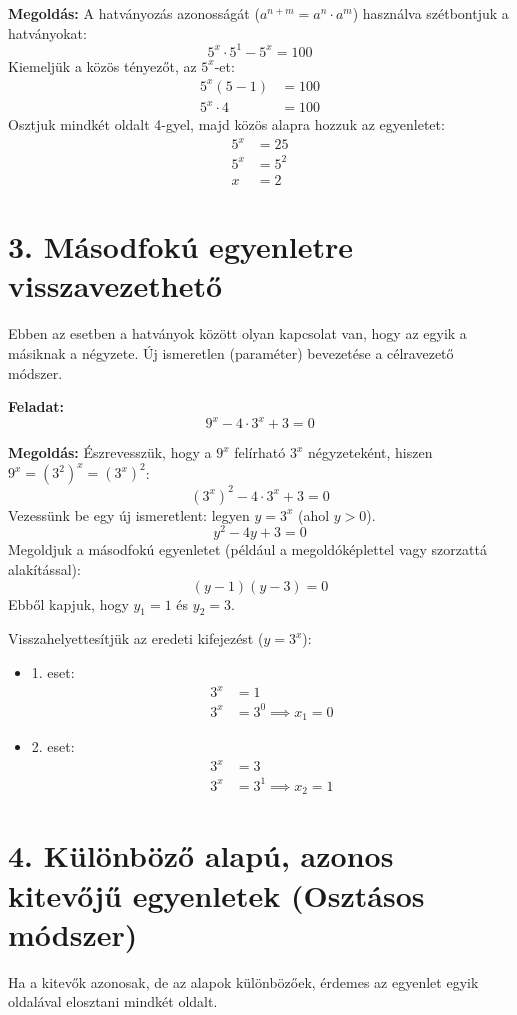 \documentclass[11pt, a4paper]{article}
\begin{document}
\textbf{Megoldás:}
A hatványozás azonosságát ($a^{n+m} = a^n \cdot a^m$) használva szétbontjuk a hatványokat:
\[ 5^x \cdot 5^1 - 5^x = 100 \]
Kiemeljük a közös tényezőt, az $5^x$-et:
\begin{align*}
5^x(5 - 1) &= 100 \\
5^x \cdot 4 &= 100
\end{align*}
Osztjuk mindkét oldalt 4-gyel, majd közös alapra hozzuk az egyenletet:
\begin{align*}
5^x &= 25 \\
5^x &= 5^2 \\
x &= 2
\end{align*}


\section*{3. Másodfokú egyenletre visszavezethető}
Ebben az esetben a hatványok között olyan kapcsolat van, hogy az egyik a másiknak a négyzete. Új ismeretlen (paraméter) bevezetése a célravezető módszer.

\textbf{Feladat:}
\[ 9^x - 4 \cdot 3^x + 3 = 0 \]

\textbf{Megoldás:}
Észrevesszük, hogy a $9^x$ felírható $3^x$ négyzeteként, hiszen $9^x = (3^2)^x = (3^x)^2$:
\[ (3^x)^2 - 4 \cdot 3^x + 3 = 0 \]
Vezessünk be egy új ismeretlent: legyen $y = 3^x$ (ahol $y > 0$).
\[ y^2 - 4y + 3 = 0 \]
Megoldjuk a másodfokú egyenletet (például a megoldóképlettel vagy szorzattá alakítással):
\[ (y - 1)(y - 3) = 0 \]
Ebből kapjuk, hogy $y_1 = 1$ és $y_2 = 3$.

Visszahelyettesítjük az eredeti kifejezést ($y = 3^x$):
\begin{itemize}
    \item 1. eset:
    \begin{align*}
    3^x &= 1 \\
    3^x &= 3^0 \implies x_1 = 0
    \end{align*}
    \item 2. eset:
    \begin{align*}
    3^x &= 3 \\
    3^x &= 3^1 \implies x_2 = 1
    \end{align*}
\end{itemize}


\section*{4. Különböző alapú, azonos kitevőjű egyenletek (Osztásos módszer)}
Ha a kitevők azonosak, de az alapok különbözőek, érdemes az egyenlet egyik oldalával elosztani mindkét oldalt.
\end{document}
